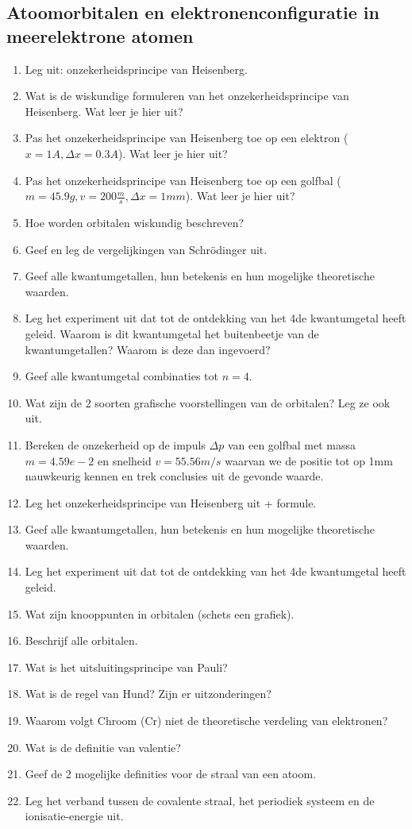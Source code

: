 \documentclass[a4paper,12pt]{article}
\begin{document}
    \subsection*{Atoomorbitalen en elektronenconfiguratie in meerelektrone atomen}
    \begin{enumerate}
        \item Leg uit: onzekerheidsprincipe van Heisenberg.
        \item Wat is de wiskundige formuleren van het onzekerheidsprincipe van Heisenberg. Wat leer je hier uit?
        \item Pas het onzekerheidsprincipe van Heisenberg toe op een elektron ($x=1 A  , \Delta x = 0.3 A$). Wat leer je hier uit?
        \item Pas het onzekerheidsprincipe van Heisenberg toe op een golfbal ($m=45.9g , v=200 \frac{m}{s}, \Delta x = 1mm$). Wat leer je hier uit?
        \item Hoe worden orbitalen wiskundig beschreven?
        \item Geef en leg de vergelijkingen van Schrödinger uit.
        \item Geef alle kwantumgetallen, hun betekenis en hun mogelijke theoretische waarden.
        \item Leg het experiment uit dat tot de ontdekking van het 4de kwantumgetal heeft geleid. Waarom is dit kwantumgetal het buitenbeetje van de kwantumgetallen? Waarom is deze dan ingevoerd?
        \item Geef alle kwantumgetal combinaties tot $n=4$.
        \item Wat zijn de 2 soorten grafische voorstellingen van de orbitalen? Leg ze ook uit.
        \item Bereken de onzekerheid op de impuls $\Delta p$ van een golfbal met massa $m = 4.59e-2$ en
        snelheid $v = 55.56 m/s$ waarvan we de positie tot op 1mm nauwkeurig kennen en trek conclusies uit de gevonde waarde.
        \item Leg het onzekerheidsprincipe van Heisenberg uit + formule.
        \item Geef alle kwantumgetallen, hun betekenis en hun mogelijke theoretische waarden.
        \item Leg het experiment uit dat tot de ontdekking van het 4de kwantumgetal heeft geleid.
        \item Wat zijn knooppunten in orbitalen (schets een grafiek).
        \item Beschrijf alle orbitalen.
        \item Wat is het uitsluitingsprincipe van Pauli?
        \item Wat is de regel van Hund? Zijn er uitzonderingen?
        \item Waarom volgt Chroom (Cr) niet de theoretische verdeling van elektronen?
        \item Wat is de definitie van valentie?
        \item Geef de 2 mogelijke definities voor de straal van een atoom.
        \item Leg het verband tussen de covalente straal, het periodiek systeem en de ionisatie-energie uit.
    \end{enumerate}
\end{document}

